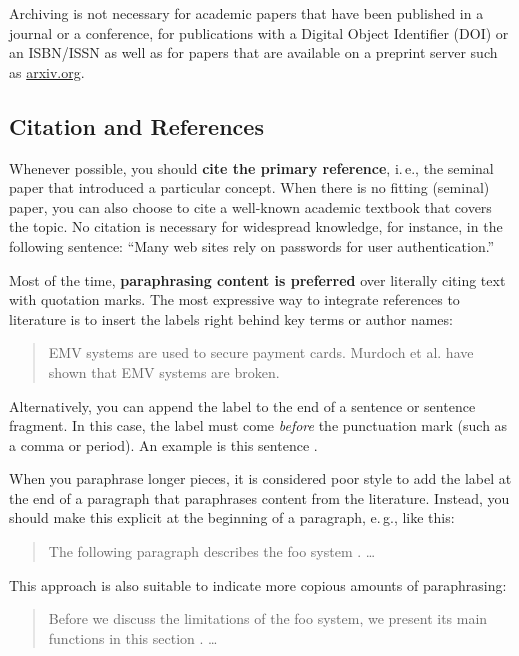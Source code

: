 Archiving is not necessary for academic papers that have been published in a journal or a conference, for publications with a Digital Object Identifier (DOI) or an ISBN/ISSN as well as for papers that are available on a preprint server such as \url{arxiv.org}.


\subsection{Citation and References}

Whenever possible, you should \textbf{cite the primary reference},
i.\,e., the seminal paper that introduced a particular concept. When there is no fitting (seminal) paper, you can also choose to cite a well-known academic textbook that covers the topic. No citation is necessary for widespread knowledge, for instance, in the following sentence: ``Many web sites rely on passwords for user authentication.''

Most of the time, \textbf{paraphrasing content is preferred} over literally citing text with quotation marks. The most expressive way to integrate references to literature is to insert the labels right behind key terms or author names:
\begin{quote}
  EMV systems \cite{anderson_ross_emv:_2014} are used to secure payment cards. Murdoch et al. \cite{murdoch_steven_j._chip_2010} have shown that EMV systems are broken.
\end{quote}

Alternatively, you can append the label to the end of a sentence or sentence fragment. In this case, the label must come \emph{before} the punctuation mark (such as a comma or period). An example is this sentence \cite{Hintz02}.

When you paraphrase longer pieces, it is considered poor style to add the label at the end of a paragraph that paraphrases content from the literature. Instead, you should make this explicit at the beginning of a paragraph, e.\,g., like this:
\begin{quote}
  The following paragraph describes the foo system \cite{kou_weidong_secure_2003}. …
\end{quote}

This approach is also suitable to indicate more copious amounts of paraphrasing:
\begin{quote}
  Before we discuss the limitations of the foo system, we present its main functions in this section \cite{kou_weidong_secure_2003}. …
\end{quote}

